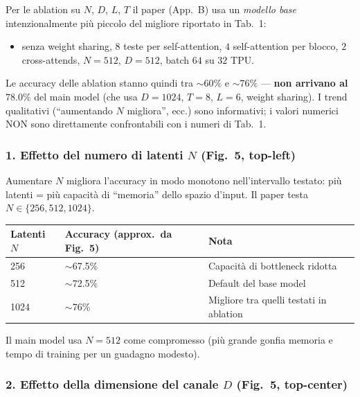\documentclass[
  11pt,
]{article}
\begin{document}
\begin{notabox}[title={\textbf{Attenzione: ablation su un modello ridotto, non sul best model}}]
Per le ablation su $N$, $D$, $L$, $T$ il paper (App.\ B) usa un \emph{modello base} intenzionalmente più piccolo del migliore riportato in Tab.\ 1:
\begin{itemize}
\item senza weight sharing, $8$ teste per self-attention, $4$ self-attention per blocco, $2$ cross-attends, $N = 512$, $D = 512$, batch $64$ su $32$ TPU.
\end{itemize}
Le accuracy delle ablation stanno quindi tra $\sim60\%$ e $\sim76\%$ --- \textbf{non arrivano al $78.0\%$} del main model (che usa $D = 1024$, $T = 8$, $L = 6$, weight sharing). I trend qualitativi (``aumentando $N$ migliora'', ecc.) sono informativi; i valori numerici NON sono direttamente confrontabili con i numeri di Tab.\ 1.
\end{notabox}

\subsubsection*{1. Effetto del numero di latenti $N$ (Fig.\ 5, top-left)}

Aumentare $N$ migliora l'accuracy in modo monotono nell'intervallo testato: più latenti = più capacità di ``memoria'' dello spazio d'input. Il paper testa $N \in \{256, 512, 1024\}$.

{\small
\begin{longtable}{@{}p{3cm} p{3cm} p{6cm}@{}}
\toprule
\textbf{Latenti $N$} & \textbf{Accuracy (approx.\ da Fig.\ 5)} & \textbf{Nota} \\
\midrule
\endhead
256  & $\sim$67.5\% & Capacità di bottleneck ridotta \\[2pt]
512  & $\sim$72.5\% & Default del base model \\[2pt]
1024 & $\sim$76\%   & Migliore tra quelli testati in ablation \\[2pt]
\bottomrule
\end{longtable}
}

Il main model usa $N = 512$ come compromesso (più grande gonfia memoria e tempo di training per un guadagno modesto).

\subsubsection*{2. Effetto della dimensione del canale $D$ (Fig.\ 5, top-center)}
\end{document}
